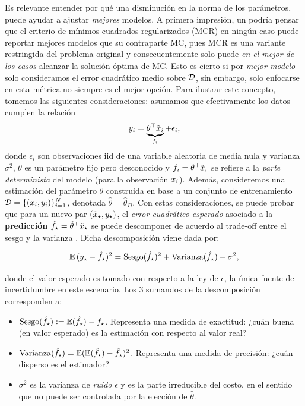 Es relevante entender por qué una disminución en la norma de los parámetros, puede ayudar a ajustar \emph{mejores} modelos. A primera impresión, un podría pensar que el criterio de mínimos cuadrados regularizados (MCR) en ningún caso puede reportar mejores modelos que su contraparte MC, pues MCR es una variante restringida del problema original y consecuentemente solo puede \emph{en el mejor de los casos} alcanzar la solución óptima de MC. Esto es cierto si por \emph{mejor modelo} solo consideramos el error cuadrático medio sobre ${\mathcal D}$, sin embargo, solo enfocarse en esta métrica no siempre es el mejor opción. Para ilustrar este concepto, tomemos las siguientes consideraciones: asumamos que efectivamente los datos cumplen la relación
\begin{equation}
	y_i = \underbrace{\theta^\top\tilde{x}_i}_{f_i} + \epsilon_i,	
 \end{equation}
 donde $\epsilon_i$ son observaciones iid de una variable aleatoria de media nula y varianza $\sigma^2$, $\theta$ es un parámetro fijo pero desconocido y $f_i= \theta^\top\tilde{x}_i$ se refiere a la  \emph{parte determinista} del modelo (para la observación $\tilde{x}_i$). Además, consideremos una estimación del parámetro $\theta$ construida en base a un conjunto de entrenamiento ${\mathcal D}=\{(\tilde{x}_i,y_i)\}_{i=1}^N$, denotada $\hat\theta=\hat\theta_D$. Con estas consideraciones, se puede probar que para un nuevo par $(\tilde{x}_\star,y_\star)$, el \emph{error cuadrático esperado} asociado a la \textbf{predicción} $\hat f_\star = \hat\theta^\top \tilde{x}_\star$ se puede descomponer de acuerdo al trade-off entre el sesgo y la varianza \cite{ISLbook}. Dicha descomposición viene dada por:
 
\begin{equation}
 	\operatorname{\mathbb{E}}{(y_\star - \hat f_\star)^2} = \text{Sesgo}(\hat f_\star)^2 + \text{Varianza}(\hat f_\star) + \sigma^2,\label{eq:expected_sq_loss}
 \end{equation} 

 donde el valor esperado es tomado con respecto a la ley de $\epsilon$, la única fuente de incertidumbre en este escenario. Los 3 sumandos de la descomposición corresponden a:
 \begin{itemize}
 	\item $\text{Sesgo}(\hat f_\star) := \operatorname{\mathbb{E}}(\hat f_\star) - f_\star$. Representa una medida de exactitud: ¿cuán buena (en valor esperado) es la estimación con respecto al valor real?
 	\item $\text{Varianza}(\hat f_\star) = \operatorname{\mathbb{E}}(\operatorname{\mathbb{E}}(\hat f_\star)- \hat f_\star)^2$. Representa una medida de precisión: ¿cuán disperso es el estimador?
 	\item $\sigma^2$ es la varianza de \emph{ruido} $\epsilon$ y es la parte irreducible del costo, en el sentido que no puede ser controlada por la elección de $\hat\theta$.
 \end{itemize}

